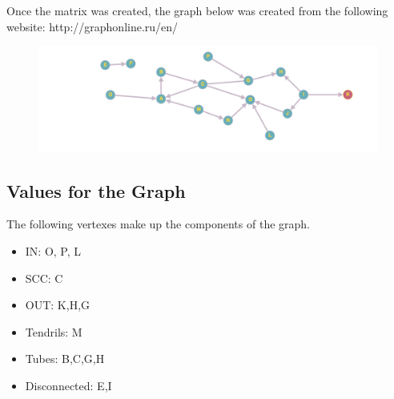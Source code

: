 \documentclass[a4paper,12pt]{article}
\begin{document}
Once the matrix was created, the graph below was created from the following website: http://graphonline.ru/en/ \\ 
\begin{figure}[h]
\centering
\includegraphics[width=20cm]{graph}
\end{figure}
\newpage 
\subsection{Values for the Graph}
The following vertexes make up the components of the graph.
\begin{itemize}
    \item IN: O, P, L
    \item SCC: C
    \item OUT: K,H,G
    \item Tendrils: M
    \item Tubes: B,C,G,H
    \item Disconnected: E,I
\end{itemize}
\end{document}
